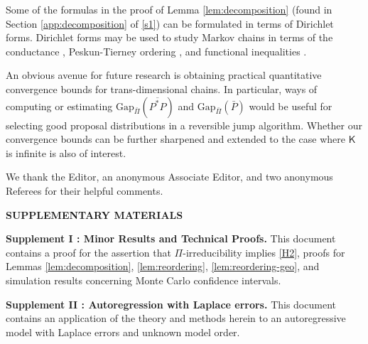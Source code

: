 \documentclass[12pt]{article}
\makeatletter
\def\namedlabel#1#2{\begingroup
	#2%
	\def\@currentlabel{#2}%
	\phantomsection\label{#1}\endgroup
}
\makeatother
\begin{document}
{
Some of the formulas in the proof of Lemma \ref{lem:decomposition} (found in Section \ref{app:decomposition} of \ref{s1}) can be formulated in terms of Dirichlet forms.
Dirichlet forms may be used to study Markov chains in terms of the conductance \citep{lawler1988bounds}, Peskun-Tierney ordering \citep{andrieu2019peskun}, and functional inequalities \citep{power2024weak}.
}

An obvious avenue for future research is obtaining practical quantitative convergence bounds for trans-dimensional chains.
In particular, ways of computing or estimating $\mbox{Gap}_{\bar{\Pi}}(\overline{P^*P})$ and $\mbox{Gap}_{\bar{\Pi}}(\bar{P})$ would be useful for selecting good proposal distributions in a reversible jump algorithm. 
Whether our convergence bounds can be further sharpened and extended to the case where $\mathsf{K}$ is infinite is also of interest.


\vspace{0.5cm}

We thank the Editor, an anonymous Associate Editor, and two anonymous Referees for their helpful comments.








\bigskip
\begin{center}
{\large\bf SUPPLEMENTARY MATERIALS}
\end{center}

{\bf \namedlabel{s1}{Supplement I}: Minor Results and Technical Proofs. } This document contains a proof for the assertion that $\Pi$-irreducibility implies \ref{H2}, proofs for Lemmas \ref{lem:decomposition}, \ref{lem:reordering}, \ref{lem:reordering-geo}, and simulation results concerning Monte Carlo confidence intervals.

{\bf \namedlabel{s2}{Supplement II}: Autoregression with Laplace errors. } This document contains an application of the theory and methods herein to an autoregressive model with Laplace errors and unknown model order. 






\end{document}
